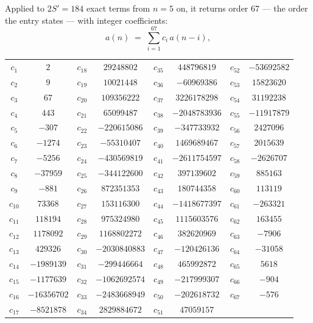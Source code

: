 \documentclass[11pt,a4paper]{article}
\theoremstyle{plain}
\theoremstyle{definition}
\begin{document}
Applied to $2S'=184$ exact terms from $n=5$ on, it returns order $67$ --- the
order the entry states --- with integer coefficients:
\[
a(n)\;=\;\sum_{i=1}^{67}c_i\,a(n-i),
\]
\begin{center}\small
\begin{tabular}{cccccccc}
$c_{1}$ & $2$ & $c_{18}$ & $29248802$ & $c_{35}$ & $448796819$ & $c_{52}$ & $-53692582$ \\
$c_{2}$ & $9$ & $c_{19}$ & $10021448$ & $c_{36}$ & $-60969386$ & $c_{53}$ & $15823620$ \\
$c_{3}$ & $67$ & $c_{20}$ & $109356222$ & $c_{37}$ & $3226178298$ & $c_{54}$ & $31192238$ \\
$c_{4}$ & $443$ & $c_{21}$ & $65099487$ & $c_{38}$ & $-2048783936$ & $c_{55}$ & $-11917879$ \\
$c_{5}$ & $-307$ & $c_{22}$ & $-220615086$ & $c_{39}$ & $-347733932$ & $c_{56}$ & $2427096$ \\
$c_{6}$ & $-1274$ & $c_{23}$ & $-55310407$ & $c_{40}$ & $1469689467$ & $c_{57}$ & $2015639$ \\
$c_{7}$ & $-5256$ & $c_{24}$ & $-430569819$ & $c_{41}$ & $-2611754597$ & $c_{58}$ & $-2626707$ \\
$c_{8}$ & $-37959$ & $c_{25}$ & $-344122600$ & $c_{42}$ & $397139602$ & $c_{59}$ & $885163$ \\
$c_{9}$ & $-881$ & $c_{26}$ & $872351353$ & $c_{43}$ & $180744358$ & $c_{60}$ & $113119$ \\
$c_{10}$ & $73368$ & $c_{27}$ & $153116300$ & $c_{44}$ & $-1418677397$ & $c_{61}$ & $-263321$ \\
$c_{11}$ & $118194$ & $c_{28}$ & $975324980$ & $c_{45}$ & $1115603576$ & $c_{62}$ & $163455$ \\
$c_{12}$ & $1178092$ & $c_{29}$ & $1168802272$ & $c_{46}$ & $382620969$ & $c_{63}$ & $-7906$ \\
$c_{13}$ & $429326$ & $c_{30}$ & $-2030840883$ & $c_{47}$ & $-120426136$ & $c_{64}$ & $-31058$ \\
$c_{14}$ & $-1989139$ & $c_{31}$ & $-299446664$ & $c_{48}$ & $465992872$ & $c_{65}$ & $5618$ \\
$c_{15}$ & $-1177639$ & $c_{32}$ & $-1062692574$ & $c_{49}$ & $-217999307$ & $c_{66}$ & $-904$ \\
$c_{16}$ & $-16356702$ & $c_{33}$ & $-2483668949$ & $c_{50}$ & $-202618732$ & $c_{67}$ & $-576$ \\
$c_{17}$ & $-8521878$ & $c_{34}$ & $2829884672$ & $c_{51}$ & $47059157$ &  &  \\
\end{tabular}
\end{center}
\end{document}
